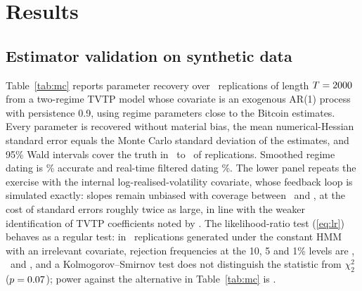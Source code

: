 \documentclass[11pt,a4paper]{article}
\begin{document}
\section{Results}\label{sec:results}
\subsection{Estimator validation on synthetic data}

Table~\ref{tab:mc} reports parameter recovery over \SynN\ replications of length $T=2000$ from a two-regime TVTP model whose covariate is an exogenous AR(1) process with persistence 0.9, using regime parameters close to the Bitcoin estimates. Every parameter is recovered without material bias, the mean numerical-Hessian standard error equals the Monte Carlo standard deviation of the estimates, and 95\% Wald intervals cover the truth in \SynCovMin\ to \SynCovMax\ of replications. Smoothed regime dating is \SynAccS\% accurate and real-time filtered dating \SynAccF\%. The lower panel repeats the exercise with the internal log-realised-volatility covariate, whose feedback loop is simulated exactly: slopes remain unbiased with coverage between \SynIntCovMin\ and \SynIntCovMax, at the cost of standard errors roughly twice as large, in line with the weaker identification of TVTP coefficients noted by \citet{modee2026}. The likelihood-ratio test (\ref{eq:lr}) behaves as a regular test: in \SynN\ replications generated under the constant HMM with an irrelevant covariate, rejection frequencies at the 10, 5 and 1\% levels are \SynSizeTen, \SynSizeFive\ and \SynSizeOne, and a Kolmogorov--Smirnov test does not distinguish the statistic from $\chi^2_2$ ($p=0.07$); power against the alternative in Table~\ref{tab:mc} is \SynPower.
\end{document}
